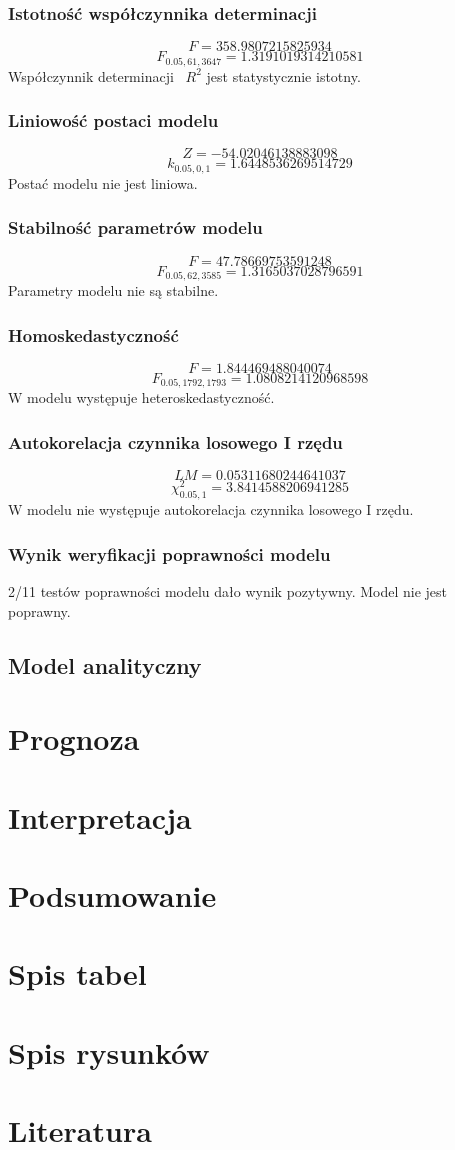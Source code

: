 \documentclass{article}
\begin{document}
\subsubsection{Istotność współczynnika determinacji}
\[F = 358.9807215825934\]
\[F_{0.05, 61, 3647} = 1.3191019314210581\]
Współczynnik determinacji ~$R^2$ jest statystycznie istotny.
\subsubsection{Liniowość postaci modelu}
\[Z = -54.02046138883098\]
\[k_{0.05, 0, 1} = 1.6448536269514729\]
Postać modelu nie jest liniowa.
\subsubsection{Stabilność parametrów modelu}
\[F = 47.78669753591248\]
\[F_{0.05, 62, 3585} = 1.3165037028796591\]
Parametry modelu nie są stabilne.
\subsubsection{Homoskedastyczność}
\[F = 1.844469488040074\]
\[F_{0.05, 1792, 1793} = 1.0808214120968598\]
W modelu występuje heteroskedastyczność.
\subsubsection{Autokorelacja czynnika losowego I rzędu}
\[LM = 0.05311680244641037\]
\[\chi^2_{0.05, 1} = 3.8414588206941285\]
W modelu nie występuje autokorelacja czynnika losowego I rzędu.
\subsubsection{Wynik weryfikacji poprawności modelu}
2/11 testów poprawności modelu dało wynik pozytywny. Model nie jest poprawny.



\subsection{Model analityczny}


\section{Prognoza}

\section{Interpretacja}

\section{Podsumowanie}

\newpage
\section{Spis tabel}
\renewcommand\listtablename{}
\listoftables


\newpage
\section{Spis rysunków}
\renewcommand\listfigurename{}
\listoffigures


\newpage
\section{Literatura}
\printbibliography[heading=none]
\end{document}
